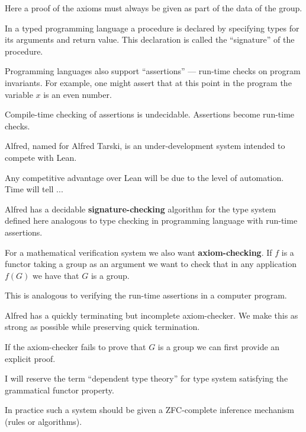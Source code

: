 {\vfill
Here a proof of the axioms must always be given as part of the data of the group.



\vfill
In a typed programming language a procedure is declared by specifying types for its arguments and return value.  This declaration is called the ``signature'' of the procedure.

\vfill
Programming languages also support ``assertions'' --- run-time checks on program invariants.  For example, one might assert that at this point
in the program the variable $x$ is an even number.

\vfill
Compile-time checking of assertions is undecidable. Assertions become run-time checks.



Alfred, named for Alfred Tarski, is an under-development system intended to compete with Lean.

\vfill
Any competitive advantage over Lean will be due to the level of automation.  Time will tell ...



Alfred has a decidable {\bf signature-checking} algorithm for the type system defined here analogous
to type checking in programming language with run-time assertions.

\vfill
For a mathematical verification system we also want {\bf axiom-checking}. If $f$ is a functor taking a group as an argument
we want to check that in any application $f(G)$ we have that $G$ is a group.

\vfill
This is analogous to verifying the run-time assertions in a computer program.


Alfred has a quickly terminating but incomplete axiom-checker.  We make this as strong as possible while preserving quick termination.

\vfill
If the axiom-checker fails to prove that $G$ is a group we can first provide an explicit proof.


\vfill
I will reserve the term ``dependent type theory'' for type system satisfying the grammatical functor property.

\vfill
In practice such a system should be given a ZFC-complete inference mechanism (rules or algorithms).

}
